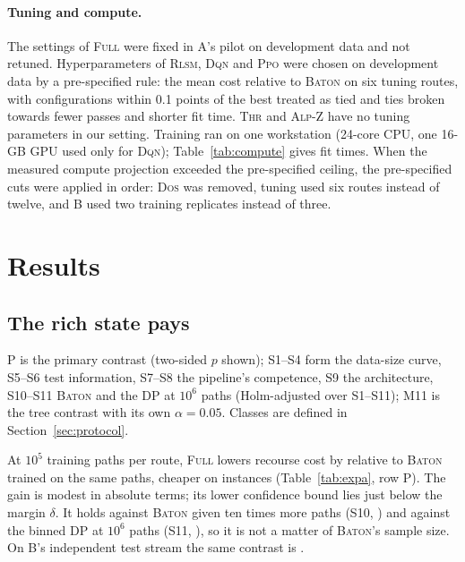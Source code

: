 \documentclass[trsc,dblanonrev]{informs4}
\newcommand{\Full}{\textsc{Full}}
\newcommand{\Baton}{\textsc{Baton}}
\newcommand{\Thr}{\textsc{Thr}}
\newcommand{\Alpz}{\textsc{Alp-Z}}
\newcommand{\Rlsm}{\textsc{Rlsm}}
\newcommand{\Dqn}{\textsc{Dqn}}
\newcommand{\Ppo}{\textsc{Ppo}}
\newcommand{\Dos}{\textsc{Dos}}
\begin{document}
\paragraph{Tuning and compute.} The settings of \Full{} were fixed in A's pilot
on development data and not retuned. Hyperparameters of \Rlsm{}, \Dqn{} and
\Ppo{} were chosen on development data by a pre-specified rule: the mean cost
relative to \Baton{} on six tuning routes, with configurations within 0.1
points of the best treated as tied and ties broken towards fewer passes and
shorter fit time. \Thr{} and \Alpz{} have no tuning parameters in our setting.
Training ran on one workstation (24-core CPU, one 16-GB GPU used only for
\Dqn{}); Table~\ref{tab:compute} gives fit times. When the measured compute
projection exceeded the pre-specified ceiling, the pre-specified cuts were
applied in order: \Dos{} was removed, tuning used six routes instead of
twelve, and B used two training replicates instead of three.

\section{Results}\label{sec:results}

\subsection{The rich state pays}

\begin{table}[t]
{\scriptsize}
{P is the primary contrast (two-sided $p$ shown); S1--S4 form the data-size
curve, S5--S6 test information, S7--S8 the pipeline's competence, S9 the
architecture, S10--S11 \Baton{} and the DP at $10^6$ paths (Holm-adjusted over
S1--S11); M11 is the tree contrast with its own $\alpha = 0.05$. Classes are
defined in Section~\ref{sec:protocol}.}
\end{table}

At $10^5$ training paths per route, \Full{} lowers recourse cost by \APrim{}
\APrimCI{} relative to \Baton{} trained on the same paths, cheaper on
\APrimBetter{} instances (Table~\ref{tab:expa}, row P). The gain is modest in
absolute terms; its lower confidence bound lies just below the margin $\delta$.
It holds against \Baton{} given ten times more paths (S10, \ASten{}) and
against the binned DP at $10^6$ paths (S11, \ASeleven{}), so it is not a matter
of \Baton{}'s sample size. On B's independent test stream the same contrast is
\BReEval{} \BReEvalCI{}.
\end{document}
